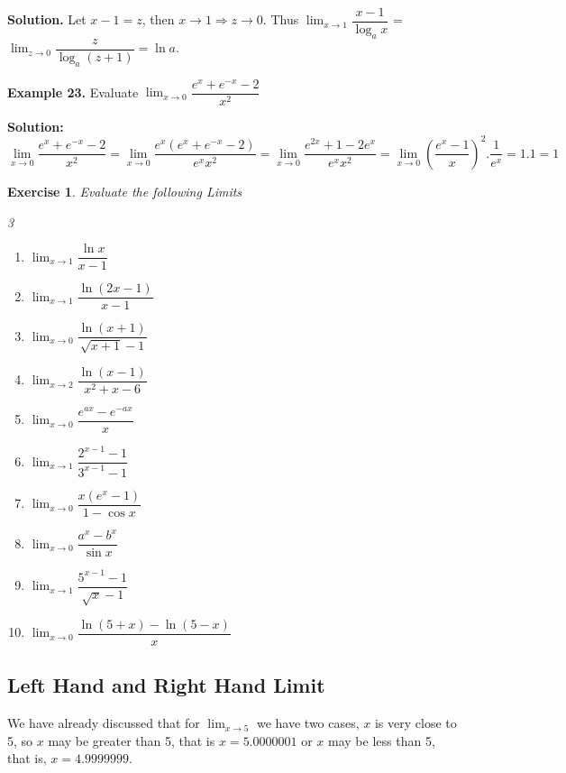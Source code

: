 \documentclass[../../main.tex]{subfiles}
\newtheorem{exercise}{Exercise}[section]
\begin{document}
\textbf{Solution.} Let $x-1 = z$, then $x \rightarrow 1 \Rightarrow z \rightarrow 0$. Thus 
$\lim_{x\rightarrow 1}\dfrac{x-1}{\log_a x}$ = $\lim_{z\rightarrow 0}\dfrac{z}{\log_a (z+1)} = \ln a$. 

\vspace{0.2cm}
\textbf{Example 23.}
\vspace{0.2cm}
Evaluate $\lim_{x\rightarrow 0}\dfrac{e^x+e^{-x}-2}{x^2}$

\textbf{Solution:} 
\begin{equation*}
    \lim_{x\rightarrow 0}\frac{e^x+e^{-x}-2}{x^2} = \lim_{x\rightarrow 0}\frac{e^x(e^x+e^{-x}-2)}{e^xx^2} = \lim_{x\rightarrow 0}\frac{e^{2x}+1-2e^x}{e^xx^2} = \lim_{x\rightarrow 0}\left(\frac{e^x-1}{x}\right)^2.\frac{1}{e^x} = 1.1 = 1
\end{equation*}

\begin{exercise}
Evaluate the following Limits
\begin{multicols}{3}
\begin{enumerate}
    \item $\lim_{x \rightarrow 1}\dfrac{\ln x}{x-1}$
    \item $\lim_{x \rightarrow 1}\dfrac{\ln (2x-1)}{x-1}$
     \item $\lim_{x \rightarrow 0}\dfrac{\ln (x+1)}{\sqrt{x+1}-1}$
     \item $\lim_{x \rightarrow 2}\dfrac{\ln (x-1)}{x^2+x-6}$
     \item $\lim_{x \rightarrow 0}\dfrac{e^{ax}-e^{-ax}}{x}$
     \item $\lim_{x \rightarrow 1}\dfrac{2^{x-1}-1}{3^{x-1}-1}$
     \item $\lim_{x \rightarrow 0}\dfrac{x(e^x-1)}{1-\cos x}$
     \item $\lim_{x \rightarrow 0}\dfrac{a^x-b^x}{\sin x}$
     \item $\lim_{x \rightarrow 1}\dfrac{5^{x-1}-1}{\sqrt{x}-1}$
     \item $\lim_{x \rightarrow 0}\dfrac{\ln(5+x)-\ln(5-x)}{x}$
\end{enumerate}    
\end{multicols}
\end{exercise}

\subsection{Left Hand and Right Hand Limit}

We have already discussed that for $\lim_{x\rightarrow5}$ we have two cases, $x$ is very close to 5, so $x$ may be greater than 5, that is ${x = 5.0000001}$  or  $x$   may  be  less  than 5,  that is,  ${x = 4.9999999}$.
\end{document}
